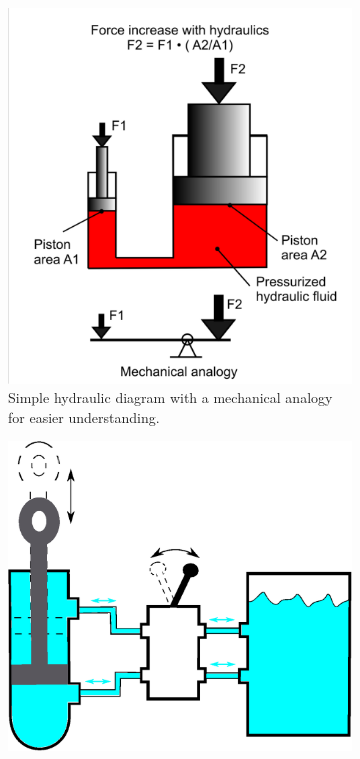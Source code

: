 \begin{figure}[htbp]
        \centering
        \begin{subfigure}[b]{0.3\textwidth}
                \includegraphics[width=\textwidth]{images/Hydraulic_Force_Torque}
                \caption{Simple hydraulic diagram with a mechanical analogy for easier understanding.}
                \label{fig:hydraSimpleDiag}
        \end{subfigure}%
        \qquad %
        \begin{subfigure}[b]{0.4\textwidth}
                \includegraphics[width=\textwidth]{images/pump_internal}

\end{subfigure}
\end{figure}
